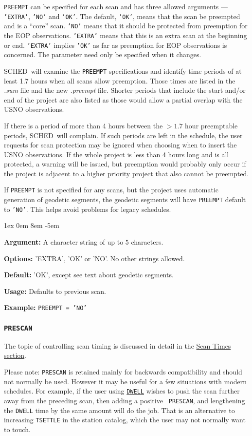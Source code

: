 \documentclass{report}
\newcommand{\schedb}{{\sc SCHED~}}
\newcommand{\rcwbox}[5]{
  \begin{list}{}{\parsep 1ex  \itemsep 0em
                 \leftmargin 8em  \itemindent -5em }
    \item {\bf Argument:} #1
    \item {\bf Options:}  #2
    \item {\bf Default:}  #3
    \item {\bf Usage:}    #4
    \item {\bf Example:}  #5
  \end{list}
}
\begin{document}
{\tt PREEMPT} can be specified for each scan and has three allowed
arguments --- {\tt 'EXTRA'}, {\tt 'NO'} and {\tt 'OK'}.  The default,
{\tt 'OK'}, means that the scan be preempted and is a ``core'' scan.
{\tt 'NO'} means that it should be protected from preemption for the
EOP observations.  {\tt 'EXTRA'} means that this is an extra scan at
the beginning or end.  {\tt 'EXTRA'} implies {\tt 'OK'} as far as
preemption for EOP observations is concerned.  The parameter need only
be specified when it changes.

\schedb will examine the {\tt PREEMPT} specifications and identify
time periods of at least 1.7 hours when all scans allow preemption.
Those times are listed in the {\sl .sum} file and the new {\sl .preempt}
file.  Shorter periods that include the start and/or end of the project
are also listed as those would allow a partial overlap with the USNO
observations.

If there is a period of more than 4 hours between the $>1.7$ hour
preemptable periods, \schedb will complain.  If such periods are left
in the schedule, the user requests for scan protection may be ignored
when choosing when to insert the USNO observations.  If the whole project
is less than 4 hours long and is all protected, a warning will be
issued, but preemption would probably only occur if the project is
adjacent to a higher priority project that also cannot be preempted.

If {\tt PREEMPT} is not specified for any scans, but the project
uses automatic generation of geodetic segments, the geodetic segments
will have {\tt PREEMPT} default to {\tt 'NO'}.  This helps avoid
problems for legacy schedules.

\rcwbox
{A character string of up to 5 characters.}
{'EXTRA', 'OK' or 'NO'.  No other strings allowed.}
{'OK', except see text about geodetic segments.}
{Defaults to previous scan.}
{{\tt PREEMPT = 'NO'}}


\subsubsection{\label{MP:PRESCAN}{\tt PRESCAN}}

The topic of controlling scan timing is discussed in detail in
the 
{\hyperref[SSEC:SCANTIMES]{Scan Times section}}.

Please note: {\tt PRESCAN} is retained mainly for backwards
compatibility and should not normally be used.  However it may be
useful for a few situations with modern schedules.  For example, if
the user using 
{\hyperref[MP:DWELL]{{\tt DWELL}}} wishes to push the scan
further away from the preceding scan, then adding a positive {\tt
PRESCAN}, and lengthening the {\tt DWELL} time by the same amount will
do the job.  That is an alternative to increasing {\tt TSETTLE} in the
station catalog, which the user may not normally want to touch.
\end{document}
